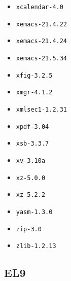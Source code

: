 \begin{itemize}
\item \verb|xcalendar-4.0|
\item \verb|xemacs-21.4.22|
\item \verb|xemacs-21.4.24|
\item \verb|xemacs-21.5.34|
\item \verb|xfig-3.2.5|
\item \verb|xmgr-4.1.2|
\item \verb|xmlsec1-1.2.31|
\item \verb|xpdf-3.04|
\item \verb|xsb-3.3.7|
\item \verb|xv-3.10a|
\item \verb|xz-5.0.0|
\item \verb|xz-5.2.2|
\item \verb|yasm-1.3.0|
\item \verb|zip-3.0|
\item \verb|zlib-1.2.13|
\end{itemize}

\subsection{EL9}
\label{sect:software-el9}

